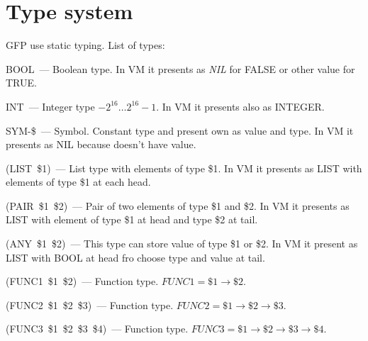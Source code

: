 \documentclass[a4paper]{article}
\begin{document}
 {}
 \section{Type system}
  GFP use static typing. List of types:
  \begin{list}{-}{}
   \item BOOL~--- Boolean type. In VM it presents as \textit{NIL} for FALSE or other value for TRUE. 
   \item INT~--- Integer type $-2^{16} \ldots 2^{16}-1$. In VM it presents also as INTEGER.
   \item SYM-\$~--- Symbol. Constant type and present own as value and type. In VM it presents as NIL because doesn't have value.
   \item (LIST~\$1)~--- List type with elements of type \$1. In VM it presents as LIST with elements of type \$1 at each head.
   \item (PAIR~\$1~\$2)~--- Pair of two elements of type \$1 and \$2. In VM it presents as LIST with element of type \$1 at head and type \$2 at tail.
   \item (ANY~\$1~\$2)~--- This type can store value of type \$1 or \$2. In VM it present as LIST with BOOL at head fro choose type and value at tail.
   \item (FUNC1~\$1~\$2)~--- Function type. $FUNC1 = \$1 \rightarrow \$2$.
   \item (FUNC2~\$1~\$2~\$3)~--- Function type. $FUNC2 = \$1 \rightarrow \$2 \rightarrow \$3$.
   \item (FUNC3~\$1~\$2~\$3~\$4)~--- Function type. $FUNC3 = \$1 \rightarrow \$2 \rightarrow \$3 \rightarrow \$4$.
  \end{list}
\end{document}
